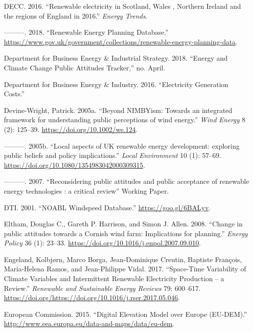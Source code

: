 \documentclass[a4paper,]{article}
\theoremstyle{definition}
\theoremstyle{definition}
\theoremstyle{definition}
\theoremstyle{remark}
\begin{document}
\leavevmode\hypertarget{ref-DECC2016}{}%
DECC. 2016. ``Renewable electricity in Scotland, Wales , Northern
Ireland and the regions of England in 2016.'' \emph{Energy Trends}.

\leavevmode\hypertarget{ref-DECC2018}{}%
---------. 2018. ``Renewable Energy Planning Database.''
\url{https://www.gov.uk/government/collections/renewable-energy-planning-data}.

\leavevmode\hypertarget{ref-DBIES2018}{}%
Department for Business Energy \& Industrial Strategy. 2018. ``Energy
and Climate Change Public Attitudes Tracker,'' no. April.

\leavevmode\hypertarget{ref-DBIES2016}{}%
Department for Business Energy \& Industry. 2016. ``Electricity
Generation Costs.''

\leavevmode\hypertarget{ref-Devine-Wright2005a}{}%
Devine-Wright, Patrick. 2005a. ``Beyond NIMBYism: Towards an integrated
framework for understanding public perceptions of wind energy.''
\emph{Wind Energy} 8 (2): 125--39. \url{https://doi.org/10.1002/we.124}.

\leavevmode\hypertarget{ref-Devine-Wright2005}{}%
---------. 2005b. ``Local aspects of UK renewable energy development:
exploring public beliefs and policy implications.'' \emph{Local
Environment} 10 (1): 57--69.
\url{https://doi.org/10.1080/1354983042000309315}.

\leavevmode\hypertarget{ref-Devine-Wright2007}{}%
---------. 2007. ``Reconsidering public attitudes and public acceptance
of renewable energy technologies : a critical review'' Working Paper.

\leavevmode\hypertarget{ref-DTI2001}{}%
DTI. 2001. ``NOABL Windspeed Database.'' \url{https://goo.gl/6BALyv}.

\leavevmode\hypertarget{ref-Eltham2008}{}%
Eltham, Douglas C., Gareth P. Harrison, and Simon J. Allen. 2008.
``Change in public attitudes towards a Cornish wind farm: Implications
for planning.'' \emph{Energy Policy} 36 (1): 23--33.
\url{https://doi.org/10.1016/j.enpol.2007.09.010}.

\leavevmode\hypertarget{ref-ENGELAND2017600}{}%
Engeland, Kolbjørn, Marco Borga, Jean-Dominique Creutin, Baptiste
François, Maria-Helena Ramos, and Jean-Philippe Vidal. 2017.
``Space-Time Variability of Climate Variables and Intermittent Renewable
Electricity Production -- a Review.'' \emph{Renewable and Sustainable
Energy Reviews} 79: 600--617.
\url{https://doi.org/https://doi.org/10.1016/j.rser.2017.05.046}.

\leavevmode\hypertarget{ref-Commission2015}{}%
European Commission. 2015. ``Digital Elevation Model over Europe
(EU-DEM).'' \url{http://www.eea.europa.eu/data-and-maps/data/eu-dem}.
\end{document}
